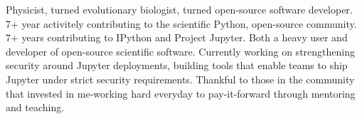 

\vspace{2mm}
\begin{cvparagraph}


Physicist, turned evolutionary biologist, turned open-source software developer. 7+ year activitely contributing to the scientific Python, open-source community.
7+ years contributing to IPython and Project Jupyter. Both a heavy user and developer of open-source scientific software. Currently working on strengthening security around Jupyter deployments, building tools that 
enable teams to ship Jupyter under strict security requirements. Thankful to those in the community that invested in me-working hard everyday to pay-it-forward through mentoring and teaching. 

\end{cvparagraph}
